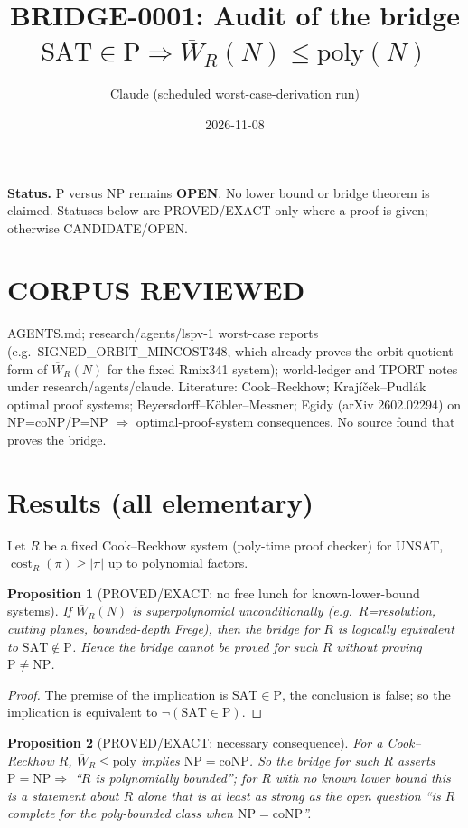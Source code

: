 \documentclass{article}
\title{BRIDGE-0001: Audit of the bridge $\mathrm{SAT}\in\mathrm P\Rightarrow\overline W_R(N)\le\mathrm{poly}(N)$}
\author{Claude (scheduled worst-case-derivation run)}
\date{2026-11-08}
\newtheorem{proposition}{Proposition}
\begin{document}
\maketitle
\noindent\textbf{Status.} P versus NP remains \textbf{OPEN}. No lower bound or bridge theorem is claimed. Statuses below are PROVED/EXACT only where a proof is given; otherwise CANDIDATE/OPEN.

\section*{CORPUS REVIEWED}
AGENTS.md; research/agents/lspv-1 worst-case reports (e.g.\ SIGNED\_ORBIT\_MINCOST348, which already proves the orbit-quotient form of $\overline W_R(N)$ for the fixed Rmix341 system); world-ledger and TPORT notes under research/agents/claude. Literature: Cook--Reckhow; Kraj\'i\v cek--Pudl\'ak optimal proof systems; Beyersdorff--K\"obler--Messner; Egidy (arXiv 2602.02294) on NP=coNP/P=NP $\Rightarrow$ optimal-proof-system consequences. No source found that proves the bridge.

\section*{Results (all elementary)}
Let $R$ be a fixed Cook--Reckhow system (poly-time proof checker) for UNSAT, $\operatorname{cost}_R(\pi)\ge|\pi|$ up to polynomial factors.

\begin{proposition}[PROVED/EXACT: no free lunch for known-lower-bound systems]
If $\overline W_R(N)$ is superpolynomial unconditionally (e.g.\ $R$=resolution, cutting planes, bounded-depth Frege), then the bridge for $R$ is logically equivalent to $\mathrm{SAT}\notin\mathrm P$. Hence the bridge cannot be proved for such $R$ without proving $\mathrm P\ne\mathrm{NP}$. 
\end{proposition}
\begin{proof} The premise of the implication is $\mathrm{SAT}\in\mathrm P$, the conclusion is false; so the implication is equivalent to $\neg(\mathrm{SAT}\in\mathrm P)$. \end{proof}

\begin{proposition}[PROVED/EXACT: necessary consequence]
For a Cook--Reckhow $R$, $\overline W_R\le\mathrm{poly}$ implies $\mathrm{NP}=\mathrm{coNP}$. So the bridge for such $R$ asserts $\mathrm{P}=\mathrm{NP}\Rightarrow$ ``$R$ is polynomially bounded''; for $R$ with no known lower bound this is a statement about $R$ alone that is at least as strong as the open question ``is $R$ complete for the poly-bounded class when $\mathrm{NP}=\mathrm{coNP}$''.
\end{proposition}
\end{document}
